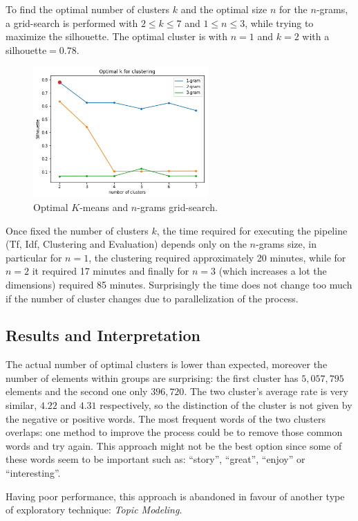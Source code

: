 \documentclass[fleqn,10pt]{SelfArx}
\begin{document}
To find the optimal number of clusters $k$ and the optimal size $n$ for the $n$-grams, a grid-search is performed with $2\leq k \leq 7$ and $1 \leq n \leq 3$, while trying to maximize the silhouette.
The optimal cluster is with $n=1$ and $k=2$ with a silhouette$=0.78$.

\begin{figure}[!h]
     \centering
     \includegraphics[width=\linewidth, height=5cm]{k_mean_opt.png}
     \caption{Optimal $K$-means and $n$-grams grid-search.}
\end{figure}

Once fixed the number of clusters $k$, the time required for executing the pipeline (Tf, Idf, Clustering and Evaluation) depends only on the $n$-grams size, in particular for $n=1$, the clustering required approximately 20 minutes, while for $n=2$ it required 17 minutes and finally for $n=3$ (which increases a lot the dimensions) required 85 minutes.
Surprisingly the time does not change too much if the number of cluster changes due to parallelization of the process.

\subsection{Results and Interpretation}
The actual number of optimal clusters is lower than expected, moreover the number of elements within groups are surprising: the first cluster has $5,057,795$ elements and the second one only $396,720$.
The two cluster's average rate is very similar, $4.22$ and $4.31$ respectively, so the distinction of the cluster is not given by the negative or positive words.
The most frequent words of the two clusters overlaps: one method to improve the process could be to remove those common words and try again.
This approach might not be the best option since some of these words seem to be important such as: ``story'', ``great'', ``enjoy'' or ``interesting''.

Having poor performance, this approach is abandoned in favour of another type of exploratory technique: \textit{Topic Modeling}.
\end{document}
